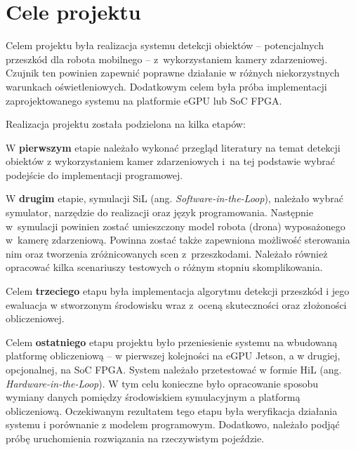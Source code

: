 

\section{Cele projektu}
\label{sec:celePracy}

Celem projektu była realizacja systemu detekcji obiektów -- potencjalnych przeszkód dla robota mobilnego -- z~wykorzystaniem kamery zdarzeniowej. Czujnik ten powinien zapewnić poprawne działanie w różnych niekorzystnych warunkach oświetleniowych. Dodatkowym celem była próba implementacji zaprojektowanego systemu na platformie eGPU lub SoC FPGA.

\noindent Realizacja projektu została podzielona na kilka etapów:

\vspace{12px}

W \textbf{pierwszym} etapie należało wykonać przegląd literatury na temat detekcji obiektów z wykorzystaniem kamer zdarzeniowych i~na tej podstawie wybrać podejście do implementacji programowej.

W \textbf{drugim} etapie, symulacji SiL (ang. \textit{Software-in-the-Loop}), należało wybrać symulator, narzędzie do realizacji oraz język programowania. Następnie w~symulacji powinien zostać umieszczony model robota (drona) wyposażonego w~kamerę zdarzeniową. Powinna zostać także zapewniona możliwość sterowania nim oraz tworzenia zróżnicowanych scen z~przeszkodami.
Należało również opracować kilka scenariuszy testowych o różnym stopniu skomplikowania.

Celem \textbf{trzeciego} etapu była implementacja algorytmu detekcji przeszkód i jego ewaluacja w stworzonym środowisku wraz z~oceną skuteczności oraz złożoności obliczeniowej.

Celem \textbf{ostatniego} etapu projektu było przeniesienie systemu na wbudowaną platformę obliczeniową -- w pierwszej kolejności na eGPU Jetson, a w drugiej, opcjonalnej, na SoC FPGA. System należało przetestować w formie HiL (ang.\textit{ Hardware-in-the-Loop}). W tym celu konieczne było opracowanie sposobu wymiany danych pomiędzy środowiskiem symulacyjnym a platformą obliczeniową. Oczekiwanym rezultatem tego etapu była weryfikacja działania systemu i porównanie z modelem programowym. Dodatkowo, należało podjąć próbę uruchomienia rozwiązania na rzeczywistym pojeździe.


